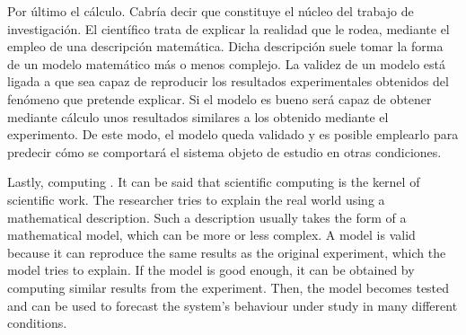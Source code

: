 \begin{paracol}{2}
\switchcolumn
Por último el cálculo.  Cabría decir que constituye el núcleo del trabajo de investigación. El científico trata de explicar la realidad que le rodea, mediante el empleo de una descripción matemática. Dicha descripción suele tomar la forma de un modelo matemático más o menos complejo. La validez de un modelo está ligada a que sea capaz de reproducir los resultados experimentales obtenidos del fenómeno que pretende explicar. Si el modelo es bueno será capaz de obtener mediante cálculo unos resultados similares a los obtenido mediante el experimento. De este modo, el modelo queda validado y es posible emplearlo para predecir cómo se comportará el sistema objeto de estudio en otras condiciones.

\switchcolumn
Lastly, computing . It can be said that scientific computing is the kernel of scientific work. The researcher tries to explain the real world using a mathematical description. Such a description usually takes the form of a mathematical model, which can be more or less complex. A model is valid because it can reproduce the same results as the original experiment, which the model tries to explain. If the model is good enough, it can be obtained by computing similar results from the experiment. Then, the model becomes tested and can be used to forecast the system's behaviour under study in many different conditions.     
\end{paracol}


